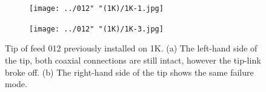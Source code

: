 \documentclass[12pt,a4paper,oneside]{article}
\begin{document}
\newpage
%
\begin{figure}[H]
   \thispagestyle{empty}
    \centering
        \begin{subfigure}[t]{0.92\textwidth}
        \centering
        \texttt{[image: ../012" "(1K)/1K-1.jpg]}
        \caption{}
        \label{fig:Tsys-1g}
   	 \end{subfigure}
	 
        \begin{subfigure}[t]{0.92\textwidth}
        \centering
        \texttt{[image: ../012" "(1K)/1K-3.jpg]}
        \caption{}
        \label{fig:SpecX-1g}
   	 \end{subfigure}
    \caption{Tip of feed 012 previously installed on 1K. (a) The left-hand side of the tip, both coaxial connections are still intact, however the tip-link broke off. (b) The right-hand side of the tip shows the same failure mode. }
    \label{fig:inspect-012(2)}
\end{figure}











%
%




\end{document}
